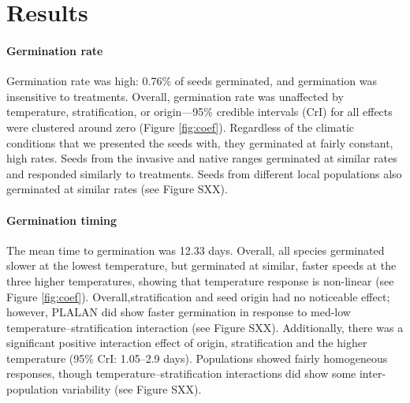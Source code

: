 \documentclass[12pt]{article}\usepackage[]{graphicx}\usepackage[]{color}
\begin{document}
	\section{Results}
	\paragraph{Germination rate} Germination rate was high: 0.76\% of seeds germinated, and germination was insensitive to treatments. Overall, germination rate was unaffected by temperature, stratification, or origin---95\% credible intervals (CrI) for all effects were clustered around zero (Figure \ref{fig:coef}). Regardless of the climatic conditions that we presented the seeds with, they germinated at fairly constant, high rates. Seeds from the invasive and native ranges germinated at similar rates
and responded similarly to treatments. Seeds from different local populations also germinated at similar rates (see Figure SXX).
	\paragraph{Germination timing} The mean time to germination was 12.33 days.  Overall, all species germinated slower at the lowest temperature, but germinated at similar, faster speeds at the three higher temperatures, showing that temperature response is non-linear  (see Figure \ref{fig:coef}). Overall,stratification and seed origin had no noticeable effect; however, PLALAN did show faster germination in response to med-low temperature--stratification interaction (see Figure SXX).  Additionally, there was a significant positive interaction effect of origin, stratification and the higher temperature (95\% CrI: 1.05--2.9 days). Populations showed fairly homogeneous responses, though temperature--stratification interactions did show some inter-population variability (see Figure SXX). 
\end{document}
